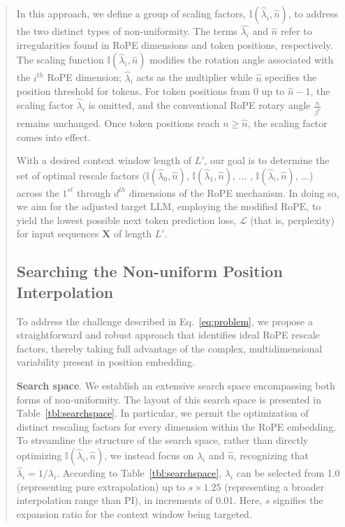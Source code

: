 \begin{abstract}
In this approach, we define a group of scaling factors, $\mathbb{I}(\hat{\lambda}_{i},\hat{n})$, to address the two distinct types of non-uniformity. The terms $\hat{\lambda_i}$ and $\hat{n}$ refer to irregularities found in RoPE dimensions and token positions, respectively. The scaling function $\mathbb{I}(\hat{\lambda}_{i},\hat{n})$ modifies the rotation angle associated with the $i^{th}$ RoPE dimension; $\hat\lambda_{i}$ acts as the multiplier while $\hat{n}$ specifies the position threshold for tokens. For token positions from $0$ up to $\hat{n}-1$, the scaling factor $\hat\lambda_{i}$ is omitted, and the conventional RoPE rotary angle $\frac{n}{\beta^i}$ remains unchanged. Once token positions reach $n\ge\hat{n}$, the scaling factor comes into effect.

With a desired context window length of $L'$, our goal is to determine the set of optimal rescale factors ($\mathbb{I}(\hat{\lambda}_{0},\hat{n})$, $\mathbb{I}(\hat{\lambda}_{1},\hat{n})$, ... , $\mathbb{I}(\hat{\lambda}_{i},\hat{n})$, ...) across the $1^{st}$ through $d^{th}$ dimensions of the RoPE mechanism. In doing so, we aim for the adjusted target $\text{LLM}$, employing the modified $\text{RoPE}$, to yield the lowest possible next token prediction loss, $\mathcal{L}$ (that is, perplexity) for input sequences $\mathbf{X}$ of length $L'$.

\subsection{Searching the Non-uniform Position Interpolation}

To address the challenge described in Eq.~\ref{eq:problem}, we propose a straightforward and robust approach that identifies ideal RoPE rescale factors, thereby taking full advantage of the complex, multidimensional variability present in position embedding.

\textbf{Search space}. We establish an extensive search space encompassing both forms of non-uniformity. The layout of this search space is presented in Table~\ref{tbl:searchspace}. In particular, we permit the optimization of distinct rescaling factors for every dimension within the RoPE embedding. To streamline the structure of the search space, rather than directly optimizing $\mathbb{I}(\hat{\lambda}_{i},\hat{n})$, we instead focus on $\lambda_i$ and $\hat{n}$, recognizing that $\hat{\lambda}_{i}=1/\lambda_i$. According to Table~\ref{tbl:searchspace}, $\lambda_i$ can be selected from 1.0 (representing pure extrapolation) up to $s\times1.25$ (representing a broader interpolation range than PI), in increments of 0.01. Here, $s$ signifies the expansion ratio for the context window being targeted.


\end{abstract}
